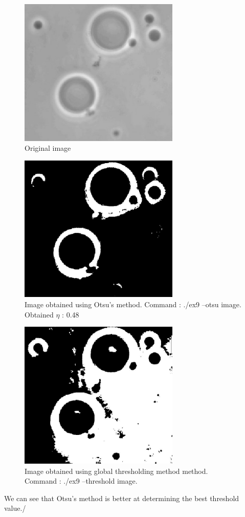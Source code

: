 \documentclass[10pt]{article}
\begin{document}
\begin{figure}[!ht]
	\centering
	\includegraphics[height=200pt]{./ex9/polymersomes.jpg}
	\caption{Original image}
\end{figure}
\begin{figure}[!ht]
	\centering
	\includegraphics[height=200pt]{./ex9/polymersomes_otsu.jpg}
	\caption{Image obtained using Otsu's method. Command : ./ex9 --otsu image. Obtained $\eta$ : 0.48}
\end{figure}
\begin{figure}[!ht]
	\centering
	\includegraphics[height=200pt]{./ex9/polymersomes_global.jpg}
	\caption{Image obtained using global thresholding method method. Command : ./ex9 --threshold image.}
\end{figure}
\clearpage
We can see that Otsu's method is better at determining the best threshold value./
\end{document}
